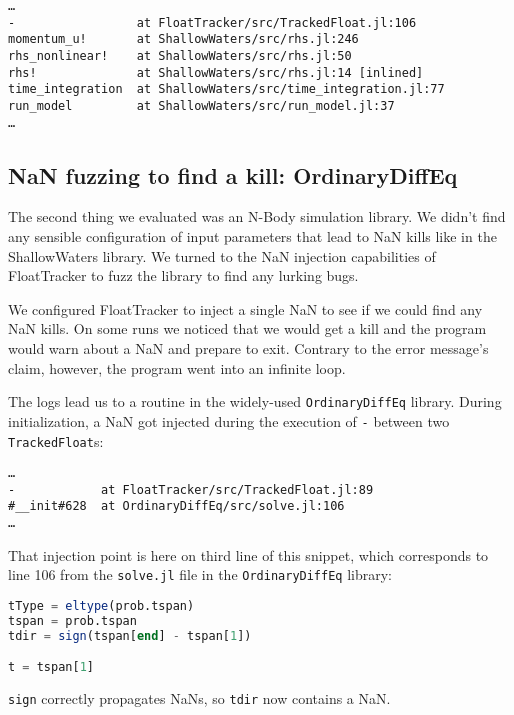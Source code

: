\documentclass{juliacon}
\begin{document}
\begin{verbatim}
…
-                 at FloatTracker/src/TrackedFloat.jl:106
momentum_u!       at ShallowWaters/src/rhs.jl:246
rhs_nonlinear!    at ShallowWaters/src/rhs.jl:50
rhs!              at ShallowWaters/src/rhs.jl:14 [inlined]
time_integration  at ShallowWaters/src/time_integration.jl:77
run_model         at ShallowWaters/src/run_model.jl:37
…
\end{verbatim}


\subsection{NaN fuzzing to find a kill: OrdinaryDiffEq}

The second thing we evaluated was an N-Body simulation library.
We didn't find any sensible configuration of input parameters that lead to NaN kills like in the ShallowWaters library.
We turned to the NaN injection capabilities of FloatTracker to fuzz the library to find any lurking bugs.

We configured FloatTracker to inject a single NaN to see if we could find any NaN kills.
On some runs we noticed that we would get a kill and the program would warn about a NaN and prepare to exit.
Contrary to the error message's claim, however, the program went into an infinite loop.

The logs lead us to a routine in the widely-used \texttt{OrdinaryDiffEq} library.
During initialization, a NaN got injected during the execution of \texttt{-} between two \texttt{TrackedFloat}s:

\begin{verbatim}
…
-            at FloatTracker/src/TrackedFloat.jl:89
#__init#628  at OrdinaryDiffEq/src/solve.jl:106
…
\end{verbatim}

That injection point is here on third line of this snippet, which corresponds to line 106 from the \texttt{solve.jl} file in the \texttt{OrdinaryDiffEq} library:

\begin{lstlisting}[language = Julia]
tType = eltype(prob.tspan)
tspan = prob.tspan
tdir = sign(tspan[end] - tspan[1])

t = tspan[1]
\end{lstlisting}

\texttt{sign} correctly propagates NaNs, so \texttt{tdir} now contains a NaN.
\end{document}
